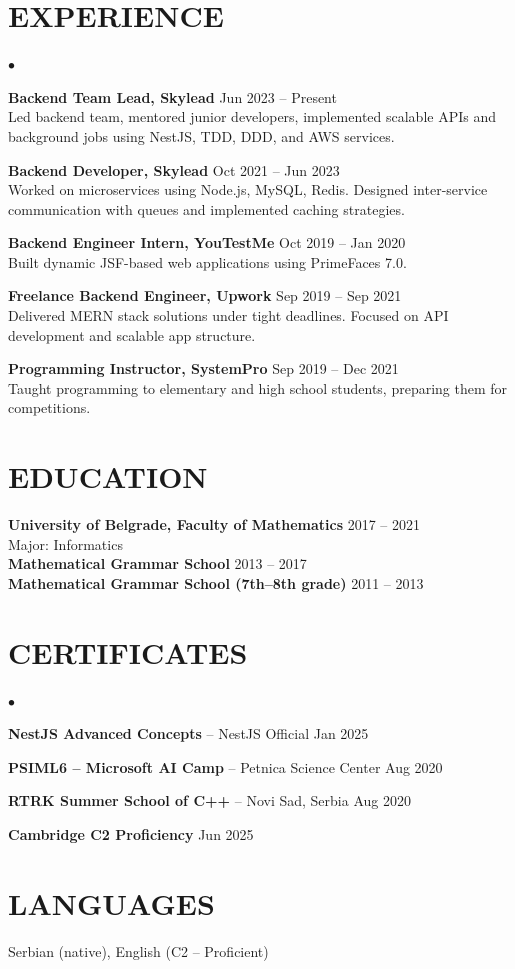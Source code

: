 \documentclass[margin,center]{res}
\newenvironment{list1}{
  \begin{list}{$\bullet$}{
      \setlength{\itemsep}{0in}
      \setlength{\parsep}{0in}
      \setlength{\parskip}{0in}
      \setlength{\topsep}{0in}
      \setlength{\partopsep}{0in}
      \setlength{\leftmargin}{0.17in}}}{\end{list}}
\begin{document}
\begin{resume}
\section{EXPERIENCE}
\begin{list1}
\item \textbf{Backend Team Lead, Skylead} \hfill Jun 2023 -- Present \\
Led backend team, mentored junior developers, implemented scalable APIs and background jobs using NestJS, TDD, DDD, and AWS services.

\item \textbf{Backend Developer, Skylead} \hfill Oct 2021 -- Jun 2023 \\
Worked on microservices using Node.js, MySQL, Redis. Designed inter-service communication with queues and implemented caching strategies.

\item \textbf{Backend Engineer Intern, YouTestMe} \hfill Oct 2019 -- Jan 2020 \\
Built dynamic JSF-based web applications using PrimeFaces 7.0.

\item \textbf{Freelance Backend Engineer, Upwork} \hfill Sep 2019 -- Sep 2021 \\
Delivered MERN stack solutions under tight deadlines. Focused on API development and scalable app structure.

\item \textbf{Programming Instructor, SystemPro} \hfill Sep 2019 -- Dec 2021 \\
Taught programming to elementary and high school students, preparing them for competitions.
\end{list1}

\section{EDUCATION}
\textbf{University of Belgrade, Faculty of Mathematics} \hfill 2017 -- 2021 \\
Major: Informatics \\
\textbf{Mathematical Grammar School} \hfill 2013 -- 2017 \\
\textbf{Mathematical Grammar School (7th–8th grade)} \hfill 2011 -- 2013

\section{CERTIFICATES}
\begin{list1}
\item \textbf{NestJS Advanced Concepts} – NestJS Official \hfill Jan 2025
\item \textbf{PSIML6 – Microsoft AI Camp} – Petnica Science Center \hfill Aug 2020
\item \textbf{RTRK Summer School of C++} – Novi Sad, Serbia \hfill Aug 2020
\item \textbf{Cambridge C2 Proficiency} \hfill Jun 2025
\end{list1}

\section{LANGUAGES}
Serbian (native), English (C2 – Proficient)

\end{resume}
\end{document}
